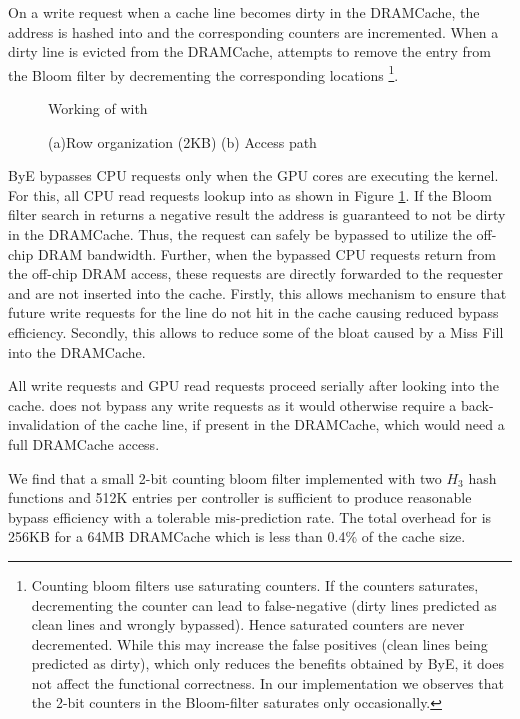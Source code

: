 On a write request when a cache line becomes dirty in the DRAMCache, the address is hashed into \bypassname and the corresponding counters are incremented. When a dirty line is evicted from the DRAMCache, \bypassname attempts to remove the entry from the Bloom filter by decrementing the corresponding locations \footnote{Counting bloom filters use saturating counters. If the counters saturates, decrementing the counter can lead to false-negative (dirty lines predicted as clean lines and wrongly bypassed). Hence saturated counters are never decremented.  While this may increase the false positives (clean lines being predicted as dirty), which only reduces the benefits obtained by ByE, it does not affect the functional correctness. In our implementation we observes that the 2-bit counters in the Bloom-filter saturates only  occasionally.}.

\begin{figure}[htb]
    \centering
    \bloom
    \caption{Working of \cachename with \bypassname }
    \label{fig:bye}
\end{figure}


\begin{figure*}[!htb]
    \centering
    \chainaccess
    \caption{\cachename (a)Row organization (2KB) (b) Access path}
    \label{fig:chain-access}
\end{figure*}
ByE bypasses CPU requests only when the GPU cores are executing the kernel. For this, all CPU read requests lookup into \bypassname as shown in Figure \ref{fig:bye}. If the Bloom filter search in \bypassname returns a  negative result the address is guaranteed to not be dirty in the DRAMCache. Thus, the request can safely be bypassed to utilize the off-chip DRAM bandwidth. 
Further, when the bypassed CPU requests return from the off-chip DRAM access, these requests are directly forwarded to the requester and are not inserted into the cache. Firstly, this allows \bypassname mechanism to ensure that future write requests for the line do not hit in the cache causing reduced bypass efficiency. Secondly, this  allows \bypassname to reduce some of the bloat caused by a Miss Fill \cite{bear} into the DRAMCache.
\par All write requests and GPU read requests proceed serially after looking into the cache. \bypassname does not bypass any write requests as it would otherwise require a back-invalidation of the cache line, if present in the DRAMCache, which would need a full DRAMCache access.
\par We find that a small 2-bit counting bloom filter implemented with two $H_3$ hash functions \cite{h3} and 512K entries per controller is sufficient 
to produce reasonable bypass efficiency with a tolerable mis-prediction rate. The total overhead for \bypassname is 256KB for a 64MB DRAMCache which is less than 0.4\% of the cache size.




